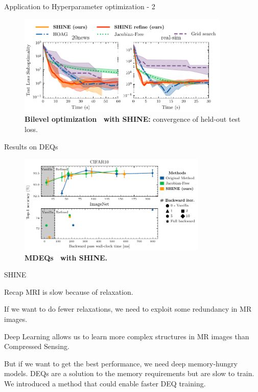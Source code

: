 \begin{frame}{Application to Hyperparameter optimization - 2}
    \begin{figure}
        \centering
        \includegraphics[width=0.9\textwidth]{Figures/shine_figures/bilevel_test.pdf}
        \caption{\textbf{Bilevel optimization~\citep{Pedregosa2016HyperparameterGradient} with SHINE:} convergence of held-out test loss.}
    \end{figure}
    
\end{frame}

\begin{frame}{Results on DEQs}
    \begin{figure}
        \centering
        \includegraphics[width=0.8\textwidth]{Figures/shine_figures/merged_results_latency_style.pdf}
        \caption{\textbf{MDEQs~\citep{Bai2020MultiscaleModels} with SHINE.}}
    \end{figure}
\end{frame}

\begin{frame}{SHINE}
    \begin{block}{Recap}
        MRI is slow because of relaxation.
        
        \pause
        If we want to do fewer relaxations, we need to exploit some redundancy in MR images.
        
        \pause
        Deep Learning allows us to learn more complex structures in MR images than Compressed Sensing.
        
        \pause
        But if we want to get the best performance, we need deep memory-hungry models.
        DEQs are a solution to the memory requirements but are slow to train.
        We introduced a method that could enable faster DEQ training.
    \end{block}
\end{frame}